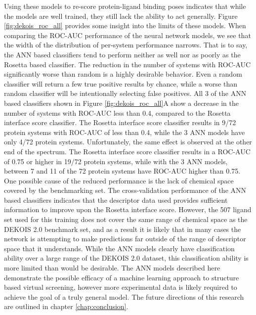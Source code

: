 Using these models to re-score protein-ligand binding poses indicates that while the models are well trained, they still lack the ability to act generally. Figure \ref{fig:dekois_roc_all} provides some insight into the limits of these models.
When comparing the \ac{ROC-AUC} performance of the neural network models, we see that the width of the distribution of per-system performance narrows.
That is to say, the \ac{ANN} based classifiers tend to perform neither as well nor as poorly as the Rosetta based classifier.
The reduction in the number of systems with \ac{ROC-AUC} significantly worse than random is a highly desirable behavior.
Even a random classifier will return a few true positive results by chance, while a worse than random classifier will be intentionally selecting false positives.
All 3 of the \ac{ANN} based classifiers shown in Figure \ref{fig:dekois_roc_all}A show a decrease in the number of systems with \ac{ROC-AUC} less than 0.4, compared to the Rosetta interface score classifier.
The Rosetta interface score classifier results in 9/72 protein systems with \ac{ROC-AUC} of less than 0.4, while the 3 \ac{ANN} models have only 4/72 protein systems.
Unfortunately, the same effect is observed at the other end of the spectrum.
The Rosetta interface score classifier results in a \ac{ROC-AUC} of 0.75 or higher in 19/72 protein systems, while with the 3 \ac{ANN} models, between 7 and 11 of the 72 protein systems have \ac{ROC-AUC} higher than 0.75. 
One possible cause of the reduced performance is the lack of chemical space covered by the benchmarking set.
The cross-validation performance of the \ac{ANN} based classifiers indicates that the descriptor data used provides sufficient information to improve upon the Rosetta interface score.
However, the 507 ligand set used for this training does not cover the same range of chemical space as the DEKOIS 2.0 benchmark set, and as a result it is likely that in many cases the network is attempting to make predictions far outside of the range of descriptor space that it understands.
While the \ac{ANN} models clearly have classification ability over a large range of the DEKOIS 2.0 dataset, this classification ability is more limited than would be desirable.
The \ac{ANN} models described here demonstrate the possible efficacy of a machine learning approach to structure based virtual screening, however more experimental data is likely required to achieve the goal of a truly general model.
The future directions of this research are outlined in chapter \ref{chap:conclusion}.